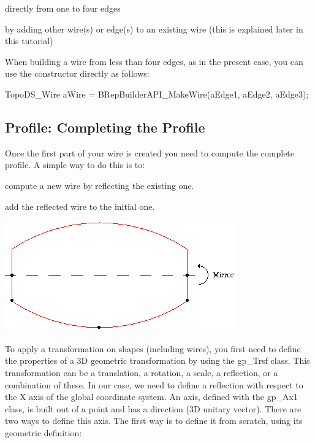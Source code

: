 \begin{DoxyItemize}
\item directly from one to four edges
\item by adding other wire(s) or edge(s) to an existing wire (this is explained later in this tutorial)
\end{DoxyItemize}

When building a wire from less than four edges, as in the present case, you can use the constructor directly as follows\+:


\begin{DoxyCode}
TopoDS\_Wire aWire = BRepBuilderAPI\_MakeWire(aEdge1, aEdge2, aEdge3);
\end{DoxyCode}
\hypertarget{occt__tutorial_OCCT_TUTORIAL_SUB2_4}{}\subsection{Profile\+: Completing the Profile}\label{occt__tutorial_OCCT_TUTORIAL_SUB2_4}
Once the first part of your wire is created you need to compute the complete profile. A simple way to do this is to\+:


\begin{DoxyItemize}
\item compute a new wire by reflecting the existing one.
\item add the reflected wire to the initial one.
\end{DoxyItemize}


\begin{DoxyImageNoCaption}
\begin{center}
   \mbox{\includegraphics[width=377]{tutorial_image006.png}}
\end{center}
\end{DoxyImageNoCaption}


To apply a transformation on shapes (including wires), you first need to define the properties of a 3D geometric transformation by using the gp\+\_\+\+Trsf class. This transformation can be a translation, a rotation, a scale, a reflection, or a combination of these. In our case, we need to define a reflection with respect to the X axis of the global coordinate system. An axis, defined with the gp\+\_\+\+Ax1 class, is built out of a point and has a direction (3D unitary vector). There are two ways to define this axis. The first way is to define it from scratch, using its geometric definition\+:


